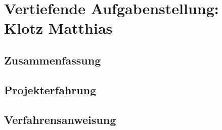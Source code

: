 \chapter[Klotz]{Vertiefende Aufgabenstellung: Klotz Matthias}

\section{Zusammenfassung}

\section{Projekterfahrung}

\section{Verfahrensanweisung}